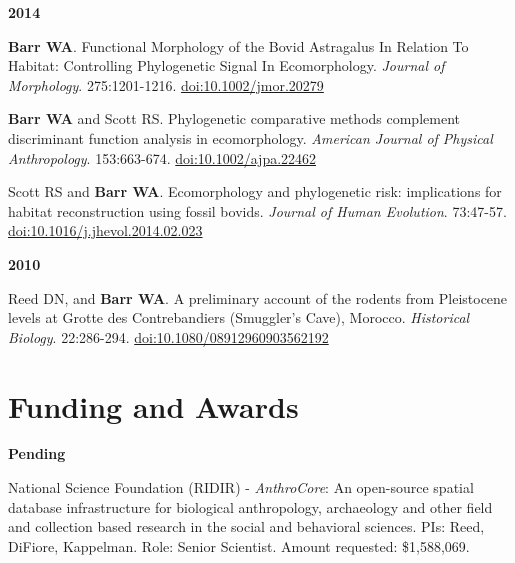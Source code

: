 \documentclass{article}
\begin{document}
\begin{description*}
\item[] {\bfseries 2014}
\item[] {\bfseries Barr WA}. Functional Morphology of the Bovid Astragalus In Relation To Habitat: Controlling Phylogenetic Signal In Ecomorphology. \emph{Journal
of Morphology}. 275:1201-1216. \href{http://dx.doi.org/10.1002/jmor.20279}{doi:10.1002/jmor.20279}

\item[] {\bfseries Barr WA} and Scott RS. Phylogenetic comparative methods complement discriminant function analysis in ecomorphology. \emph{American Journal
of Physical Anthropology}. 153:663-674. \href{http://dx.doi.org/10.1002/ajpa.22462}{doi:10.1002/ajpa.22462}

\item[] Scott RS and {\bfseries Barr WA}. Ecomorphology and phylogenetic risk: implications for habitat reconstruction using fossil bovids.
\emph{Journal of Human Evolution}. 73:47-57. \href{http://dx.doi.org/10.1016/j.jhevol.2014.02.023}{doi:10.1016/j.jhevol.2014.02.023}

\end{description*}

\begin{description*}
\item[] {\bfseries 2010}
\item[] Reed DN, and {\bfseries Barr WA}. A preliminary account of the rodents from Pleistocene levels at Grotte des Contrebandiers (Smuggler's Cave),
Morocco. \emph{Historical Biology}. 22:286-294. \href{http://dx.doi.org/10.1080/08912960903562192}{doi:10.1080/08912960903562192}
\end{description*}


\section*{Funding and Awards}

\begin{minipage}{\linewidth}
\begin{description*}
\item[] {\bfseries Pending}
\item[] National Science Foundation (RIDIR) - \emph{AnthroCore}: An open-source spatial database infrastructure for biological anthropology, archaeology and other field and collection based research in the social and behavioral sciences. PIs: Reed, DiFiore, Kappelman. Role: Senior Scientist. Amount requested: \$1,588,069.
\end{description*}
\end{minipage}
\end{document}

